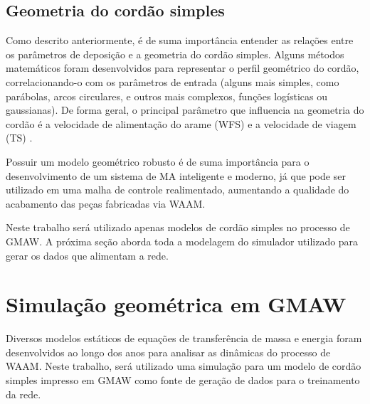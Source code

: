 

\newpage
\subsection{Geometria do cordão simples}
Como descrito anteriormente, é de suma importância entender as relações entre os parâmetros de deposição e a geometria do cordão simples. Alguns métodos matemáticos foram desenvolvidos para representar o perfil geométrico do cordão, correlacionando-o com os parâmetros de entrada (alguns mais simples, como parábolas, arcos circulares, e outros mais complexos, funções logísticas ou gaussianas). De forma geral, o principal parâmetro que influencia na geometria do cordão é a velocidade de alimentação do arame (WFS) e a velocidade de viagem (TS) \cite{cao2011overlapping}. 

Possuir um modelo geométrico robusto é de suma importância para o desenvolvimento de um sistema de MA inteligente e moderno, já que pode ser utilizado em uma malha de controle realimentado, aumentando a qualidade do acabamento das peças fabricadas via WAAM. 

Neste trabalho será utilizado apenas modelos de cordão simples no processo de GMAW. A próxima seção aborda toda a modelagem do simulador utilizado para gerar os dados que alimentam a rede.

\section{Simulação geométrica em GMAW}
\label{sec:simulation}
Diversos modelos estáticos de equações de transferência de massa e energia foram desenvolvidos ao longo dos anos para analisar as dinâmicas do processo de WAAM. Neste trabalho, será utilizado uma simulação para um modelo de cordão simples impresso em GMAW como fonte de geração de dados para o treinamento da rede. 

